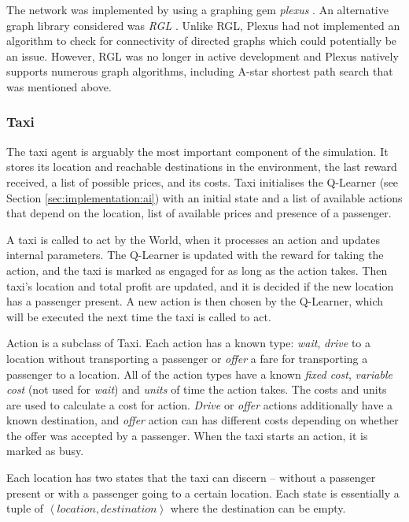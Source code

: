 The network was implemented by using a graphing gem \textit{plexus}
\parencite{Plexus}. An alternative graph library considered was \textit{RGL}
\parencite{Rgl}. Unlike RGL, Plexus had not implemented an algorithm to check
for connectivity of directed graphs which could potentially be an issue.
However, RGL was no longer in active development and Plexus natively supports
numerous graph algorithms, including A-star shortest path search that was
mentioned above.


\subsubsection{Taxi}
\label{sec:implementation:software:taxi}

The taxi agent is arguably the most important component of the simulation. It
stores its location and reachable destinations in the environment, the last
reward received, a list of possible prices, and its costs. Taxi initialises the
Q-Learner (see Section \ref{sec:implementation:ai}) with an initial state and a
list of available actions that depend on the location, list of available prices
and presence of a passenger.

A taxi is called to act by the World, when it processes an action and updates
internal parameters. The Q-Learner is updated with the reward for taking the
action, and the taxi is marked as engaged for as long as the action takes. Then
taxi's location and total profit are updated, and it is decided if the new
location has a passenger present. A new action is then chosen by the Q-Learner,
which will be executed the next time the taxi is called to act.

Action is a subclass of Taxi. Each action has a known type: \textit{wait},
\textit{drive} to a location without transporting a passenger or \textit{offer}
a fare for transporting a passenger to a location. All of the action types have
a known \textit{fixed cost}, \textit{variable cost} (not used for
\textit{wait}) and \textit{units} of time the action takes. The costs and units
are used to calculate a cost for action. \textit{Drive} or \textit{offer}
actions additionally have a known destination, and \textit{offer} action can
has different costs depending on whether the offer was accepted by a passenger.
When the taxi starts an action, it is marked as busy.

Each location has two states that the taxi can discern -- without a passenger
present or with a passenger going to a certain location. Each state is
essentially a tuple of \(\left \langle location, destination \right \rangle\)
where the destination can be empty.


